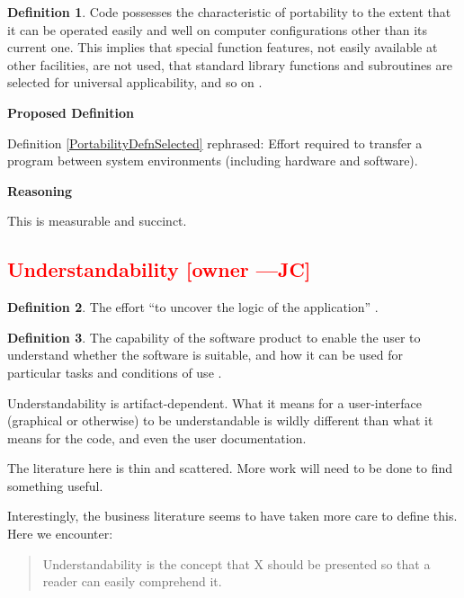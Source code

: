 \documentclass[letterpaper, cleveref]{lipics-v2019}
\newcommand{\authornote}[3]{\textcolor{#1}{[#3 ---#2]}}
\newcommand{\authornote}[3]{}
\newcommand{\jc}[1]{\authornote{red}{JC}{#1}} %
\newcommand{\notdone}[1]{\textcolor{red}{#1}}
\theoremstyle{definition}
\newtheorem{defn}{Definition}
\begin{document}
\begin{defn}
  Code possesses the characteristic of portability to the extent that it can
  be operated easily and well on computer configurations other than its
  current one. This implies that special function features, not easily
  available at other facilities, are not used, that standard library
  functions and subroutines are selected for universal applicability, and so
  on \citep{boehm2007software}.
\end{defn}

\noindent \textbf{Proposed Definition}

Definition \ref{PortabilityDefnSelected} rephrased: Effort required to transfer
a program between system environments (including hardware and software).

\noindent \textbf{Reasoning}

This is measurable and succinct. 


\subsection{\notdone{Understandability} \jc{owner}}

\begin{defn}
  The effort ``to uncover the logic of the application''
  \citep{ghezzi1991fundamentals}.
\end{defn}

\begin{defn}
  The capability of the software product to enable the user to understand
  whether the software is suitable, and how it can be used for particular tasks
  and conditions of use \cite{ISO9126}. %
\end{defn}

Understandability is artifact-dependent.  What it means for a user-interface
(graphical or otherwise) to be understandable is wildly different than what
it means for the code, and even the user documentation.

The literature here is thin and scattered.  More work will need to be done
to find something useful.

Interestingly, the business literature seems to have taken more care to
define this.  Here we encounter:

\begin{quote}
  Understandability is the concept that X should be presented so that a reader
  can easily comprehend it.
\end{quote}
\end{document}

